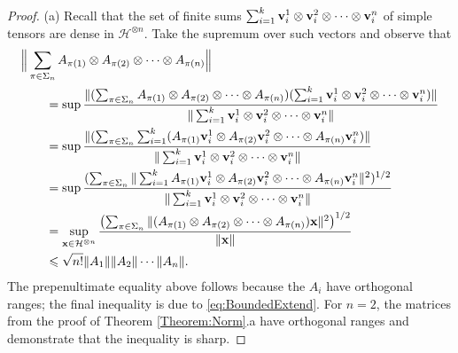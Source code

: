 \documentclass[10pt,reqno]{amsart}
\newcommand{\0}{{\color{lightgray}0}}
\renewcommand{\leq}{\leqslant}
\newcommand{\norm}[1]{\| #1 \|}
\newcommand{\h}{\mathcal{H}}
\renewcommand{\vec}[1]{{\bf #1}}
\theoremstyle{definition}
\numberwithin{equation}{section}
\begin{document}
\begin{proof}
(a) Recall that the set of finite sums $\sum_{i=1}^k \vec{v}^1_i\otimes \vec{v}^2_i \otimes \cdots \otimes \vec{v}^n_i$
of simple tensors are dense in $\h^{\otimes n}$.  Take the supremum over such vectors and observe that
\begin{align}
&\Big\|\sum_{\pi\in \Sigma_n} A_{\pi(1)} \otimes A_{\pi(2)} \otimes \dots \otimes A_{\pi(n)}\Big\|\\
&\qquad= \sup \frac{\norm{(\sum_{\pi\in \Sigma_n} A_{\pi(1)} \otimes A_{\pi(2)} \otimes \dots \otimes A_{\pi(n)})(\sum_{i=1}^k \vec{v}^1_i\otimes \vec{v}^2_i \otimes \cdots \otimes \vec{v}^n_i)}}{\norm{\sum_{i=1}^k \vec{v}^1_i\otimes \vec{v}^2_i \otimes \cdots \otimes \vec{v}^n_i}}  \\
&\qquad=\sup \frac{\norm{(\sum_{\pi\in \Sigma_n} \sum_{i=1}^k  (A_{\pi(1)}\vec{v}_i^1 \otimes A_{\pi(2)}\vec{v}_i^2 \otimes \dots \otimes A_{\pi(n)}\vec{v}_i^n)}}{\norm{\sum_{i=1}^k \vec{v}^1_i\otimes \vec{v}^2_i \otimes \cdots \otimes \vec{v}^n_i}} \\
&\qquad=\sup \frac{(\sum_{\pi\in \Sigma_n} \norm{ \sum_{i=1}^k  A_{\pi(1)}\vec{v}_i^1 \otimes A_{\pi(2)}\vec{v}_i^2 \otimes \dots \otimes A_{\pi(n)}\vec{v}_i^n}^2)^{1/2}}{\norm{\sum_{i=1}^k \vec{v}^1_i\otimes \vec{v}^2_i \otimes \cdots \otimes \vec{v}^n_i}} \\
&\qquad= \sup_{\vec{x} \in  \h^{\otimes n} }  \frac{\left( \sum_{\pi \in \Sigma_n }\norm{(A_{\pi(1)} \otimes A_{\pi(2)} \otimes \cdots \otimes A_{\pi(n)} )\vec{x}}^2\right)^{1/2}}{\norm{ \vec{x}}} \label{finalline} \\
&\qquad \leq \sqrt{n!}\norm{A_1}\norm{A_2}\cdots \norm{A_n}.
\end{align}
The prepenultimate equality above follows because the $A_i$ have orthogonal ranges;
the final inequality is due to \eqref{eq:BoundedExtend}.
For $n=2$, the matrices from the proof of Theorem \ref{Theorem:Norm}.a have orthogonal ranges and demonstrate that the inequality is sharp.


\end{proof}
\end{document}
